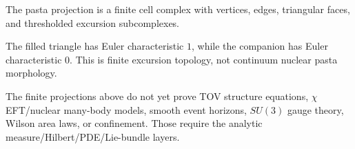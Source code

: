 \begin{proposition}\label{thm:pasta-cell-complex}\leanok{}
The pasta projection is a finite cell complex with vertices, edges, triangular
faces, and thresholded excursion subcomplexes.
\end{proposition}

\begin{theorem}\label{thm:pasta-euler-witnesses}\leanok{}
The filled triangle has Euler characteristic \(1\), while the companion
 has Euler
characteristic \(0\).  This is finite excursion topology, not continuum nuclear
pasta morphology.
\end{theorem}

\begin{theorem}\label{thm:continuum-dense-matter-frontier}\notready{}
The finite projections above do not yet prove TOV structure equations,
\(\chi\)EFT/nuclear many-body models, smooth event horizons, \(SU(3)\) gauge
theory, Wilson area laws, or confinement.  Those require the analytic
measure/Hilbert/PDE/Lie-bundle layers.
\end{theorem}
